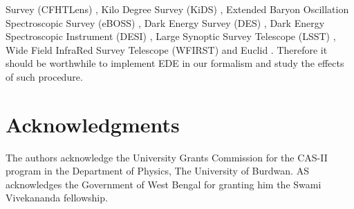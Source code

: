 \documentclass[a4paper,11pt]{article}
\begin{document}
Survey (CFHTLens) \cite{Heymans:2012gg}, Kilo Degree Survey (KiDS) \cite{Hildebrandt:2016iqg,Kohlinger:2017sxk}, Extended Baryon Oscillation Spectroscopic Survey (eBOSS) \cite{Dawson:2015wdb}, Dark Energy Survey (DES) \cite{DES:2015gax}, Dark Energy Spectroscopic Instrument (DESI) \cite{DESI:2016fyo,DESI:2016igz}, Large Synoptic Survey Telescope (LSST) \cite{LSSTScience:2009jmu,LSST:2017ags}, Wide Field InfraRed Survey Telescope (WFIRST) \cite{Spergel:2015sza,Hounsell:2017ejq} and Euclid \cite{Amendola:2016saw}. Therefore it should be worthwhile to implement EDE in our formalism and study the effects of such procedure.  


\section*{Acknowledgments}
The authors acknowledge the University Grants Commission for the CAS-II program in the Department of Physics, The University of Burdwan. AS acknowledges the Government of West Bengal for granting him the Swami Vivekananda fellowship.
\end{document}
